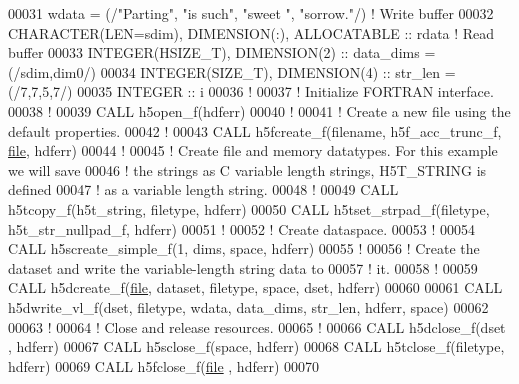 \begin{DoxyCode}
00031        wdata = (/\textcolor{stringliteral}{"Parting"}, \textcolor{stringliteral}{"is such"}, \textcolor{stringliteral}{"sweet  "}, \textcolor{stringliteral}{"sorrow."}/) \textcolor{comment}{! Write buffer}
00032   \textcolor{keywordtype}{CHARACTER(LEN=sdim)}, \textcolor{keywordtype}{DIMENSION(:)}, \textcolor{keywordtype}{ALLOCATABLE} :: rdata \textcolor{comment}{! Read buffer}
00033   \textcolor{keywordtype}{INTEGER(HSIZE\_T)}, \textcolor{keywordtype}{DIMENSION(2)} :: data\_dims = (/sdim,dim0/)
00034   \textcolor{keywordtype}{INTEGER(SIZE\_T)}, \textcolor{keywordtype}{DIMENSION(4)} :: str\_len = (/7,7,5,7/)
00035   \textcolor{keywordtype}{INTEGER} :: i
00036   \textcolor{comment}{!}
00037   \textcolor{comment}{! Initialize FORTRAN interface.}
00038   \textcolor{comment}{!}
00039   \textcolor{keyword}{CALL }h5open\_f(hdferr)
00040   \textcolor{comment}{!}
00041   \textcolor{comment}{! Create a new file using the default properties.}
00042   \textcolor{comment}{!}
00043   \textcolor{keyword}{CALL }h5fcreate\_f(filename, h5f\_acc\_trunc\_f, \hyperlink{structfile}{file}, hdferr)
00044   \textcolor{comment}{!}
00045   \textcolor{comment}{! Create file and memory datatypes.  For this example we will save}
00046   \textcolor{comment}{! the strings as C variable length strings, H5T\_STRING is defined}
00047   \textcolor{comment}{! as a variable length string.}
00048   \textcolor{comment}{!}
00049   \textcolor{keyword}{CALL }h5tcopy\_f(h5t\_string, filetype, hdferr)
00050   \textcolor{keyword}{CALL }h5tset\_strpad\_f(filetype, h5t\_str\_nullpad\_f, hdferr)
00051   \textcolor{comment}{!}
00052   \textcolor{comment}{! Create dataspace.}
00053   \textcolor{comment}{!}
00054   \textcolor{keyword}{CALL }h5screate\_simple\_f(1, dims, space, hdferr)
00055   \textcolor{comment}{!}
00056   \textcolor{comment}{! Create the dataset and write the variable-length string data to}
00057   \textcolor{comment}{! it.}
00058   \textcolor{comment}{!}
00059   \textcolor{keyword}{CALL }h5dcreate\_f(\hyperlink{structfile}{file}, dataset, filetype, space, dset, hdferr)
00060 
00061   \textcolor{keyword}{CALL }h5dwrite\_vl\_f(dset, filetype, wdata, data\_dims, str\_len, hdferr, space)
00062 
00063   \textcolor{comment}{!}
00064   \textcolor{comment}{! Close and release resources.}
00065   \textcolor{comment}{!}
00066   \textcolor{keyword}{CALL }h5dclose\_f(dset , hdferr)
00067   \textcolor{keyword}{CALL }h5sclose\_f(space, hdferr)
00068   \textcolor{keyword}{CALL }h5tclose\_f(filetype, hdferr)
00069   \textcolor{keyword}{CALL }h5fclose\_f(\hyperlink{structfile}{file} , hdferr)
00070 

\end{DoxyCode}
